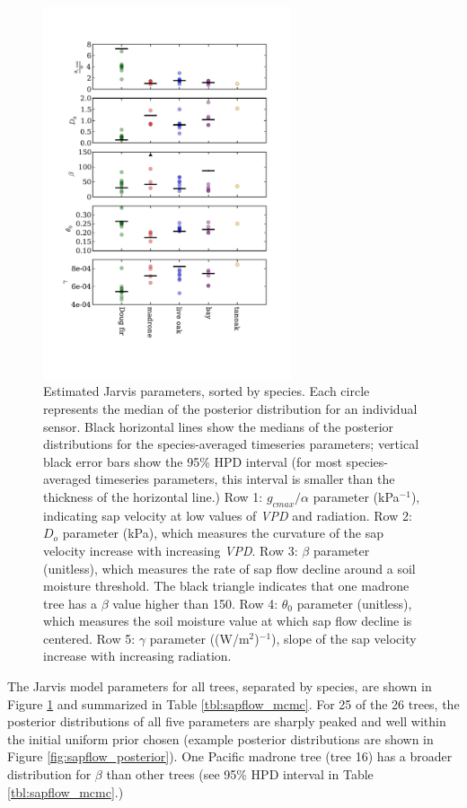 \begin{figure}[here]
\includegraphics[width=0.65\textwidth]{ch1-sapflow/figures/Figure07.pdf}
\caption{Estimated Jarvis parameters, sorted by species.  Each circle represents the median of the posterior distribution for an individual sensor.  Black horizontal lines show the medians of the posterior distributions for the species-averaged timeseries parameters; vertical black error bars show the 95\% HPD interval (for most species-averaged timeseries parameters, this interval is smaller than the thickness of the horizontal line.)  Row 1: $g_{cmax}/\alpha$ parameter (kPa$^{-1}$), indicating sap velocity at low values of \textit{VPD} and radiation.  Row 2: $D_o$ parameter (kPa), which measures the curvature of the sap velocity increase with increasing \textit{VPD}.  Row 3: $\beta$ parameter (unitless), which measures the rate of sap flow decline around a soil moisture threshold.  The black triangle indicates that one madrone tree has a $\beta$ value higher than 150. Row 4: $\theta_0$ parameter (unitless), which measures the soil moisture value at which sap flow decline is centered.  Row 5: $\gamma$ parameter ((W/m$^2$)$^{-1}$), slope of the sap velocity increase with increasing radiation.}
\label{fig:sapflow_params}
\end{figure}

The Jarvis model parameters for all trees, separated by species, are shown in Figure \ref{fig:sapflow_params} and summarized in Table \ref{tbl:sapflow_mcmc}.  For 25 of the 26 trees, the posterior distributions of all five parameters are sharply peaked and well within the initial uniform prior chosen (example posterior distributions are shown in Figure \ref{fig:sapflow_posterior}).  One Pacific madrone tree (tree 16) has a broader distribution for $\beta$ than other trees (see 95\% HPD interval in Table \ref{tbl:sapflow_mcmc}.)

